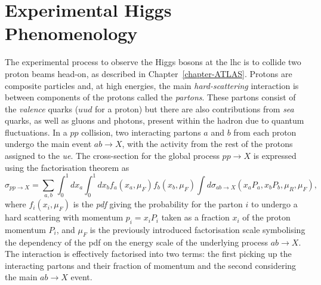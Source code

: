 \section{Experimental Higgs Phenomenology}\label{th-sec-higphe}
The experimental process to observe the Higgs bosons at the \gls{lhc} is to collide two proton beams head-on, as described in Chapter~\ref{chapter-ATLAS}. Protons are composite particles and, at high energies, the main \textit{hard-scattering} interaction is between components of the protons called the \textit{partons}. These partons consist of the \textit{valence} quarks ($uud$ for a proton) but there are also contributions from \textit{sea} quarks, as well as gluons and photons, present within the hadron due to quantum fluctuations. In a $pp$ collision, two interacting partons $a$ and $b$ from each proton undergo the main event $ab \rightarrow X$, with the activity from the rest of the protons assigned to the \textit{\gls{ue}}. The cross-section for the global process $pp \rightarrow X$ is expressed using the factorisation theorem \cite{collins2004factorization} as 
\begin{equation}
\sigma_{pp\rightarrow X} = \sum_{a,b} \int_0^1 dx_a \int_0^1 dx_b f_a(x_a, \mu_F) f_b(x_b, \mu_F) \int d\sigma_{ab\rightarrow X}\left(x_aP_a, x_bP_b, \mu_R, \mu_F \right),
\end{equation}
where $f_i(x_i, \mu_F)$ is the \textit{\gls{pdf}} giving the probability for the parton $i$ to undergo a hard scattering with momentum $p_i = x_i P_i$ taken as a fraction $x_i$ of the proton momentum $P_i$, and $\mu_F$ is the previously introduced factorisation scale symbolising the dependency of the \gls{pdf} on the energy scale of the underlying process $ab \rightarrow X$. The interaction is effectively factorised into two terms: the first picking up the interacting partons and their fraction of momentum and the second considering the main $ab \rightarrow X$ event.\\

